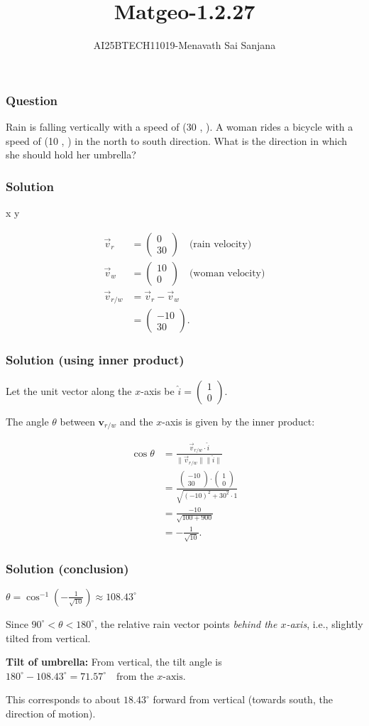 \documentclass{beamer}
\title{Matgeo-1.2.27}
\author{AI25BTECH11019-Menavath Sai Sanjana}
\date{}
\theoremstyle{remark}
\newcommand{\myvec}[1]{\ensuremath{\begin{pmatrix}#1\end{pmatrix}}}
\let\vec\mathbf
\begin{document}
\begin{frame}
\titlepage
\end{frame}

\begin{frame}
\frametitle{Question}
Rain is falling vertically with a speed of (30 , ). A woman rides a bicycle with a speed of (10 , ) in the north to south direction. What is the direction in which she should hold her umbrella?
\end{frame}
%

\begin{frame}
\frametitle{Solution}

 x y

\begin{align}
\overrightarrow{v}_r &= \myvec{0\\30} \quad \text{(rain velocity)} \\
\overrightarrow{v}_w &= \myvec{10\\0} \quad \text{(woman velocity)} \\
\overrightarrow{v}_{r/w} &= \overrightarrow{v}_r - \overrightarrow{v}_w \\
&= \myvec{-10\\30}.
\end{align}
\end{frame}

\begin{frame}
\frametitle{Solution (using inner product)}

Let the unit vector along the $x$-axis be 
$
\hat{i} = \myvec{1 \\ 0}.
$

The angle $\theta$ between $\vec{v}_{r/w}$ and the $x$-axis is given by the inner product:

\begin{align}
\cos\theta &= \frac{\overrightarrow{v}_{r/w} \cdot \hat{i}}{\|\overrightarrow{v}_{r/w}\| \|\hat{i}\|} \\
&= \frac{\myvec{-10\\30}\cdot \myvec{1\\0}}{\sqrt{(-10)^2+30^2}\cdot 1} \\
&= \frac{-10}{\sqrt{100+900}} \\
&= -\frac{1}{\sqrt{10}}.
\end{align}
\end{frame}

\begin{frame}
\frametitle{Solution (conclusion)}

$
\theta = \cos^{-1}\!\left(-\tfrac{1}{\sqrt{10}}\right) \approx 108.43^\circ
$

Since $90^\circ < \theta < 180^\circ$,  
the relative rain vector points \emph{behind the $x$-axis}, i.e., slightly tilted from vertical.

\bigskip

\textbf{Tilt of umbrella:}  
From vertical, the tilt angle is
$
180^\circ - 108.43^\circ = 71.57^\circ \quad \text{from the $x$-axis}.
$

This corresponds to about $18.43^\circ$ forward from vertical (towards south, the direction of motion).
\end{frame}
\end{document}
